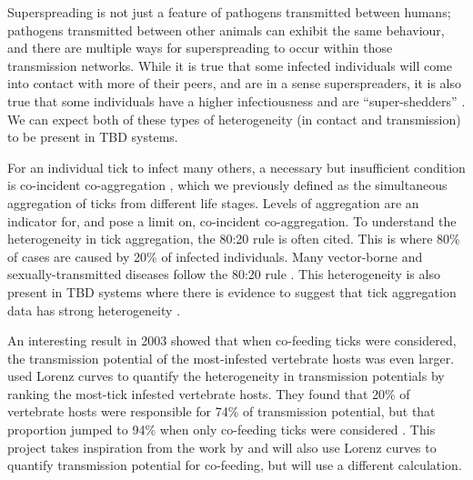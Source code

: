 \documentclass[hidelinks]{article}
\begin{document}
Superspreading is not just a feature of pathogens transmitted between humans; pathogens transmitted between other animals can exhibit the same behaviour, and there are multiple ways for superspreading to occur within those transmission networks. While it is true that some infected individuals will come into contact with more of their peers, and are in a sense superspreaders, it is also true that some individuals have a higher infectiousness and are ``super-shedders'' \citep{VanderWaal_2016}. We can expect both of these types of heterogeneity (in contact and transmission) to be present in TBD systems.

For an individual tick to infect many others, a necessary but insufficient condition is co-incident co-aggregation \citep{Ferreri2014}, which we previously defined as the simultaneous aggregation of ticks from different life stages. Levels of aggregation are an indicator for, and pose a limit on, co-incident co-aggregation. To understand the heterogeneity in tick aggregation, the 80:20 rule is often cited. This is where 80\% of cases are caused by 20\% of infected individuals. Many vector-borne and sexually-transmitted diseases follow the 80:20 rule \citep{Woolhouse1997}. This heterogeneity is also present in TBD systems where there is evidence to suggest that tick aggregation data has strong heterogeneity \citep{Ferreri2014, Brunner2008, SHAW1998, DEVEVEY_2012}.

An interesting result in 2003 showed that when co-feeding ticks were considered, the transmission potential of the most-infested vertebrate hosts was even larger. \citet{Perkins_2003} used Lorenz curves to quantify the heterogeneity in transmission potentials by ranking the most-tick infested vertebrate hosts. They found that 20\% of vertebrate hosts were responsible for 74\% of transmission potential, but that proportion jumped to 94\% when only co-feeding ticks were considered \citep{Perkins_2003}. This project takes inspiration from the work by \citet{Perkins_2003} and will also use Lorenz curves to quantify transmission potential for co-feeding, but will use a different calculation.
\end{document}
